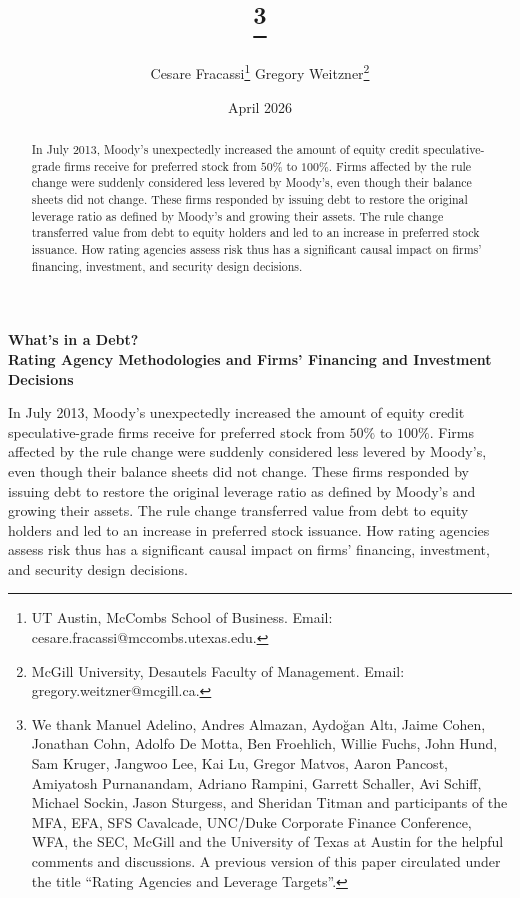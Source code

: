 \documentclass[a4paper, 12pt]{article}
\title{\singlespacing{\textbf{What's in a Debt? \\ Rating Agency Methodologies and Firms' Financing and Investment Decisions}}\thanks{We thank Manuel Adelino, Andres Almazan, Aydo\u{g}an Alt{\i}, Jaime Cohen, Jonathan Cohn, Adolfo De Motta, Ben Froehlich, Willie Fuchs, John Hund, Sam Kruger, Jangwoo Lee, Kai Lu, Gregor Matvos, Aaron Pancost, Amiyatosh Purnanandam, Adriano Rampini, Garrett Schaller, Avi Schiff, Michael Sockin, Jason Sturgess, and Sheridan Titman and participants of the MFA, EFA, SFS Cavalcade, UNC/Duke Corporate Finance Conference, WFA, the SEC, McGill and the University of Texas at Austin for the helpful comments and discussions. A previous version of this paper circulated under the title ``Rating Agencies and Leverage Targets''.}}
\author{Cesare Fracassi\footnote{UT Austin, McCombs School of Business. Email: cesare.fracassi@mccombs.utexas.edu.} \hspace{10mm} Gregory Weitzner\footnote{McGill University, Desautels Faculty of Management. Email: gregory.weitzner@mcgill.ca.}}
\date{April 2026}
\begin{document}
\maketitle
\thispagestyle{empty}


\begin{abstract}
\begin{small}
\begin{singlespace}
\noindent In July 2013, Moody's unexpectedly increased the amount of equity credit speculative-grade firms receive for preferred stock from $50\%$ to $100\%$. Firms affected by the rule change were suddenly considered less levered by Moody's, even though their balance sheets did not change. These firms responded by issuing debt to restore the original leverage ratio as defined by Moody's and growing their assets. The rule change transferred value from debt to equity holders and led to an increase in preferred stock issuance. How rating agencies assess risk thus has a significant causal impact on firms' financing, investment, and security design decisions.


\end{singlespace}
\end{small}
\end{abstract}

\clearpage
\newpage



\begin{center}
    \textbf{What's in a Debt? \\ Rating Agency Methodologies and Firms' Financing and Investment Decisions}

\end{center}

\vspace{2cm}

\noindent In July 2013, Moody's unexpectedly increased the amount of equity credit speculative-grade firms receive for preferred stock from $50\%$ to $100\%$. Firms affected by the rule change were suddenly considered less levered by Moody's, even though their balance sheets did not change. These firms responded by issuing debt to restore the original leverage ratio as defined by Moody's and growing their assets. The rule change transferred value from debt to equity holders and led to an increase in preferred stock issuance. How rating agencies assess risk thus has a significant causal impact on firms' financing, investment, and security design decisions.

\newpage
\end{document}
